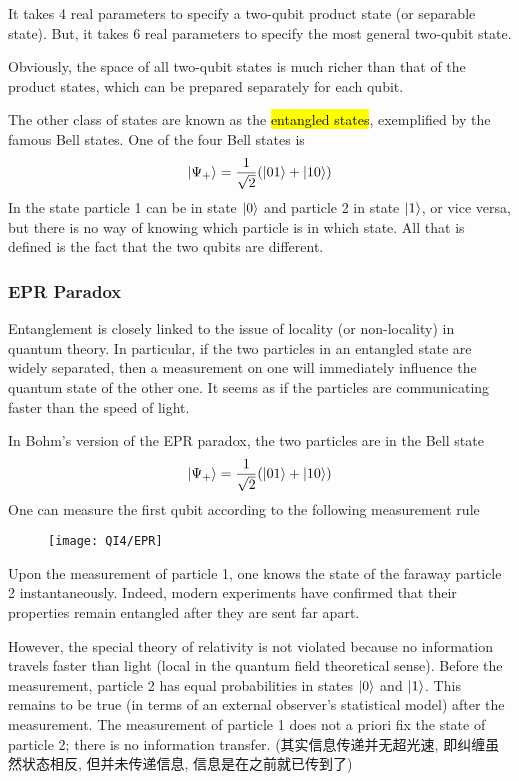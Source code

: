 It takes 4 real parameters to specify a two-qubit product state (or separable state). But, it takes 6 real parameters to specify the most general two-qubit state.

Obviously, the space of all two-qubit states is much richer than that of the product states, which can be prepared separately for each qubit.

The other class of states are known as the \hl{entangled states}, exemplified by the famous Bell states. One of the four Bell states is
\begin{align*}
    \ket{\Psi_+}=\frac{1}{\sqrt{2}}(\ket{01}+\ket{10})
\end{align*}
In the state particle 1 can be in state $\ket{0}$ and particle 2 in state $\ket{1}$, or vice versa, but there is no way of knowing which particle is in which state. All that is defined is the fact that the two qubits are different.

\subsubsection{EPR Paradox}
Entanglement is closely linked to the issue of locality (or non-locality) in quantum theory. In particular, if the two particles in an entangled state are widely separated, then a measurement on one will immediately influence the quantum state of the other one. It seems as if the particles are communicating faster than the speed of light.

In Bohm’s version of the EPR paradox, the two particles are in the Bell state
\begin{align*}
    \ket{\Psi_+}=\frac{1}{\sqrt{2}}(\ket{01}+\ket{10})
\end{align*}
One can measure the first qubit according to the following measurement rule
\begin{figure}[H]
    \centering
    \texttt{[image: QI4/EPR]}
\end{figure}

Upon the measurement of particle 1, one knows the state of the faraway particle 2 instantaneously. Indeed, modern experiments have confirmed that their properties remain entangled after they are sent far apart.

However, the special theory of relativity is not violated because no information travels faster than light (local in the quantum field theoretical sense). Before the measurement, particle 2 has equal probabilities in states $\ket{0}$ and $\ket{1}$. This remains to be true (in terms of an external observer’s statistical model) after the measurement. The measurement of particle 1 does not a priori fix the state of particle 2; there is no information transfer. (其实信息传递并无超光速, 即纠缠虽然状态相反, 但并未传递信息, 信息是在之前就已传到了)

